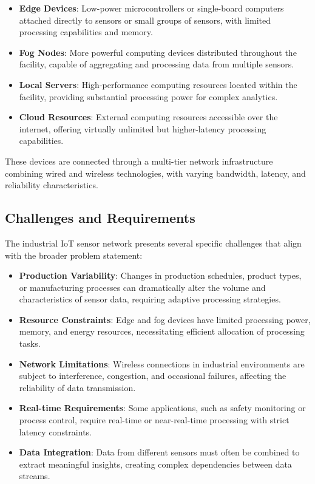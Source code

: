 \documentclass{article}
\begin{document}
\begin{itemize}
    \item \textbf{Edge Devices}: Low-power microcontrollers or single-board computers attached directly to sensors or small groups of sensors, with limited processing capabilities and memory.
    
    \item \textbf{Fog Nodes}: More powerful computing devices distributed throughout the facility, capable of aggregating and processing data from multiple sensors.
    
    \item \textbf{Local Servers}: High-performance computing resources located within the facility, providing substantial processing power for complex analytics.
    
    \item \textbf{Cloud Resources}: External computing resources accessible over the internet, offering virtually unlimited but higher-latency processing capabilities.
\end{itemize}

These devices are connected through a multi-tier network infrastructure combining wired and wireless technologies, with varying bandwidth, latency, and reliability characteristics.

\subsection{Challenges and Requirements}

The industrial IoT sensor network presents several specific challenges that align with the broader problem statement:

\begin{itemize}
    \item \textbf{Production Variability}: Changes in production schedules, product types, or manufacturing processes can dramatically alter the volume and characteristics of sensor data, requiring adaptive processing strategies.
    
    \item \textbf{Resource Constraints}: Edge and fog devices have limited processing power, memory, and energy resources, necessitating efficient allocation of processing tasks.
    
    \item \textbf{Network Limitations}: Wireless connections in industrial environments are subject to interference, congestion, and occasional failures, affecting the reliability of data transmission.
    
    \item \textbf{Real-time Requirements}: Some applications, such as safety monitoring or process control, require real-time or near-real-time processing with strict latency constraints.
    
    \item \textbf{Data Integration}: Data from different sensors must often be combined to extract meaningful insights, creating complex dependencies between data streams.
\end{itemize}
\end{document}
